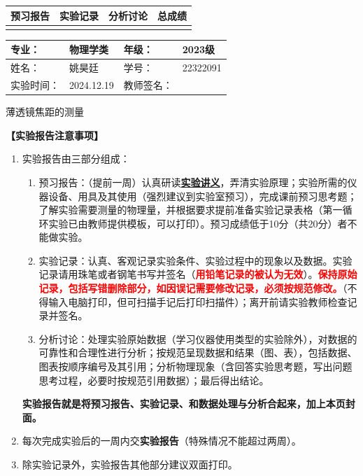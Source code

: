 \documentclass[dvipsnames, svgnames,a4paper,11pt]{article}
\begin{document}
\begin{table}
	\renewcommand\arraystretch{1.7}
	\begin{tabularx}{\textwidth}{
		|X|X|X|X
		|X|X|X|X|}
	\hline
	\multicolumn{2}{|c|}{预习报告}&\multicolumn{2}{|c|}{实验记录}&\multicolumn{2}{|c|}{分析讨论}&\multicolumn{2}{|c|}{总成绩}\\
	\hline
	 & &  & &  & &  & \\
	\hline
	\end{tabularx}
\end{table}


\begin{table}
	\renewcommand\arraystretch{1.7}
	\begin{tabularx}{\textwidth}{|X|X|X|X|}
	\hline
	专业：& 物理学类 &年级：& 2023级\\
	\hline
	姓名：& 姚昊廷  & 学号：&22322091\\
	\hline
	实验时间：& 2024.12.19& 教师签名：& \\
	\hline
	\end{tabularx}
\end{table}

\begin{center}
	\LARGE 薄透镜焦距的测量
\end{center}

\textbf{【实验报告注意事项】}
\begin{enumerate}
	\item 实验报告由三部分组成：
	\begin{enumerate}
		\item 预习报告：（提前一周）认真研读\underline{\textbf{实验讲义}}，弄清实验原理；实验所需的仪器设备、用具及其使用（强烈建议到实验室预习），完成课前预习思考题；了解实验需要测量的物理量，并根据要求提前准备实验记录表格（第一循环实验已由教师提供模板，可以打印）。预习成绩低于10分（共20分）者不能做实验。
	    \item 实验记录：认真、客观记录实验条件、实验过程中的现象以及数据。实验记录请用珠笔或者钢笔书写并签名（\textcolor{red}{\textbf{用铅笔记录的被认为无效}}）。\textcolor{red}{\textbf{保持原始记录，包括写错删除部分，如因误记需要修改记录，必须按规范修改。}}（不得输入电脑打印，但可扫描手记后打印扫描件）；离开前请实验教师检查记录并签名。
	    \item 分析讨论：处理实验原始数据（学习仪器使用类型的实验除外），对数据的可靠性和合理性进行分析；按规范呈现数据和结果（图、表），包括数据、图表按顺序编号及其引用；分析物理现象（含回答实验思考题，写出问题思考过程，必要时按规范引用数据）；最后得出结论。
	\end{enumerate}
	\textbf{实验报告就是将预习报告、实验记录、和数据处理与分析合起来，加上本页封面。}
	\item 每次完成实验后的一周内交\textbf{实验报告}（特殊情况不能超过两周）。
	\item 除实验记录外，实验报告其他部分建议双面打印。
\end{enumerate}
\end{document}
